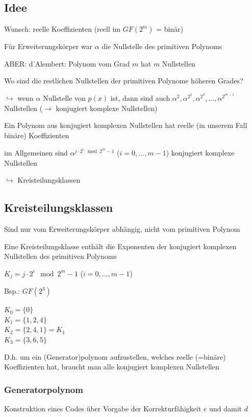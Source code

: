 \subsection{Idee}

Wunsch: reelle Koeffizienten (reell im $GF(2^m)$ = binär)

Für Erweiterungskörper war $\alpha$ die Nullstelle des primitiven Polynoms

ABER: d'Alembert: Polynom vom Grad $m$ hat $m$ Nullstellen

Wo sind die restlichen Nullstellen der primitiven Polynome höheren Grades?

$\hookrightarrow$ wenn $\alpha$ Nullstelle von $p(x)$ ist, dann sind auch $\alpha^2, \alpha^{2^2}, \alpha^{2^3}, ..., \alpha^{2^{m-1}}$
Nullstellen ($\rightarrow$ konjugiert komplexe Nullstellen)

Ein Polynom aus konjugiert komplexen Nullstellen hat reelle (in unserem Fall binäre) Koeffizienten

im Allgemeinen sind $\alpha^{j \cdot 2^i \mod 2^m - 1}$ \;\;\;\; ($i = 0, ..., m-1$) konjugiert komplexe Nullstellen

$\hookrightarrow$ Kreisteilungsklassen

\subsection{Kreisteilungsklassen}

Sind nur vom Erweiterungskörper abhängig, nicht vom primitiven Polynom

Eine Kreisteilungsklasse enthält die Exponenten der konjugiert komplexen Nullstellen des
primitiven Polynoms

$K_j = j \cdot 2^i \mod 2^m - 1$ \;\;\;\; ($i = 0, ..., m-1$)

Bsp.: $GF(2^3)$

$K_0 = \{0\}$\\
$K_1 = \{ 1, 2, 4 \}$\\
$K_2 = \{ 2, 4, 1 \} = K_1$\\
$K_3 = \{ 3, 6, 5 \}$

D.h. um ein (Generator)polynom aufzustellen, welches reelle (=binäre) Koeffizienten hat,
braucht man alle konjugiert komplexen Nullstellen

\subsubsection{Generatorpolynom}

Konstruktion eines Codes über Vorgabe der Korrekturfähigkeit $e$ und damit $d$

